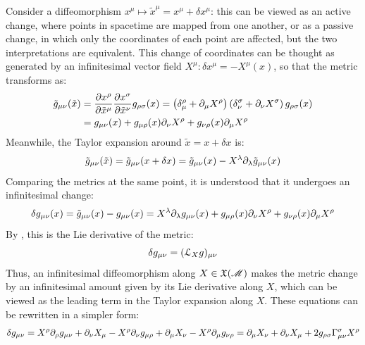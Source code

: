 Consider a diffeomorphism $ x^\mu \mapsto \tilde{x}^\mu = x^\mu + \delta x^\mu $: this can be viewed as an active change, where points in spacetime are mapped from one another, or as a passive change, in which only the coordinates of each point are affected, but the two interpretations are equivalent. This change of coordinates can be thought as generated by an infinitesimal vector field $ X^\mu : \delta x^\mu = - X^\mu (x) $, so that the metric transforms as:
\begin{equation*}
  \begin{split}
    \tilde{g}_{\mu \nu} (\tilde{x})
    &= \frac{\partial x^\rho}{\partial \tilde{x}^\mu} \frac{\partial x^\sigma}{\partial \tilde{x}^\nu} g_{\rho \sigma}(x) = \left( \delta^\rho_\mu + \partial_\mu X^\rho \right) \left( \delta^\sigma_\nu + \partial_\nu X^\sigma \right) g_{\rho \sigma}(x) \\
    &= g_{\mu \nu}(x) + g_{\mu \rho}(x) \partial_\nu X^\rho + g_{\nu \rho}(x) \partial_\mu X^\rho
  \end{split}
\end{equation*}
Meanwhile, the Taylor expansion around $ \tilde{x} = x + \delta x $ is:
\begin{equation*}
  \tilde{g}_{\mu \nu} (\tilde{x}) = \tilde{g}_{\mu \nu} (x + \delta x) = \tilde{g}_{\mu \nu}(x) - X^\lambda \partial_\lambda \tilde{g}_{\mu \nu}(x)
\end{equation*}
Comparing the metrics at the same point, it is understood that it undergoes an infinitesimal change:
\begin{equation*}
  \delta g_{\mu \nu}(x) = \tilde{g}_{\mu \nu}(x) - g_{\mu \nu}(x) = X^\lambda \partial_\lambda g_{\mu \nu}(x) + g_{\mu \rho}(x) \partial_\nu X^\rho + g_{\nu \rho}(x) \partial_\mu X^\rho
\end{equation*}
By , this is the Lie derivative of the metric:
\begin{equation}
  \delta g_{\mu \nu} = (\EuScript{L}_X g)_{\mu \nu}
  \label{eq:lie-der-metric}
\end{equation}
Thus, an infinitesimal diffeomorphism along $ X \in \mathfrak{X}(\mathscr{M}) $ makes the metric change by an infinitesimal amount given by its Lie derivative along $ X $, which can be viewed as the leading term in the Taylor expansion along $ X $. These equations can be rewritten in a simpler form:
\begin{equation*}
  \delta g_{\mu \nu} = X^\rho \partial_\rho g_{\mu \nu} + \partial_\nu X_\mu - X^\rho \partial_\nu g_{\mu \rho} + \partial_\mu X_\nu - X^\rho \partial_\mu g_{\nu \rho} = \partial_\mu X_\nu + \partial_\nu X_\mu + 2 g_{\rho \sigma} \Gamma^\sigma_{\mu \nu} X^\rho
\end{equation*}
